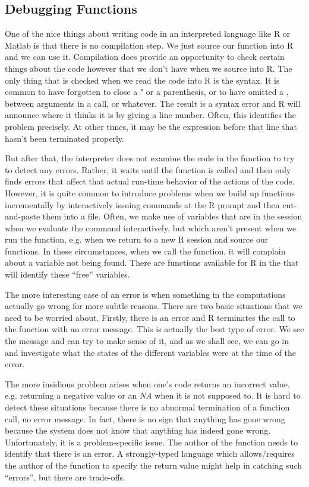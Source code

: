 {\subsection{Debugging Functions}

One of the nice things about writing code in an interpreted language
like R or Matlab is that there is no compilation step. We just source
our function into R and we can use it. Compilation does provide an
opportunity to check certain things about the code however that we
don't have when we source into R. The only thing that is checked when
we read the code into R is the syntax. It is common to have forgotten
to close a " or a parenthesis, or to have omitted a , between
arguments in a call, or whatever. The result is a syntax error and R
will announce where it thinks it is by giving a line number. Often,
this identifies the problem precisely. At other times, it may be the
expression before that line that hasn't been terminated properly.

But after that, the interpreter does not examine the code in the
function to try to detect any errors. Rather, it waits until the
function is called and then only finds errors that affect that actual
run-time behavior of the actions of the code. However, it is quite
common to introduce problems when we build up functions incrementally
by interactively issuing commands at the R prompt and then
cut-and-paste them into a file. Often, we make use of variables that
are in the session when we evaluate the command interactively, but
which aren't present when we run the function, e.g. when we return to
a new R session and source our functions. In these circumstances, when
we call the function, it will complain about a variable not being
found. There are functions available for R in the
 that will identify these ``free'' variables.

The more interesting case of an error is when something in the
computations actually go wrong for more subtle reasons. There are two
basic situations that we need to be worried about. Firstly, there is
an error and R terminates the call to the function with an error
message. This is actually the best type of error. We see the message
and can try to make sense of it, and as we shall see, we can go in and
investigate what the states of the different variables were at the
time of the error.

The more insidious problem arises when one's code returns an incorrect
value, e.g. returning a negative value or an \textit{NA} when it is
not supposed to. It is hard to detect these situations because there
is no abnormal termination of a function call, no error message. In
fact, there is no sign that anything has gone wrong because the system
does not know that anything has indeed gone wrong. Unfortunately, it
is a problem-specific issue. The author of the function needs to
identify that there is an error. A strongly-typed language which
allows/requires the author of the function to specify the return value
might help in catching such ``errors'', but there are trade-offs.

}
